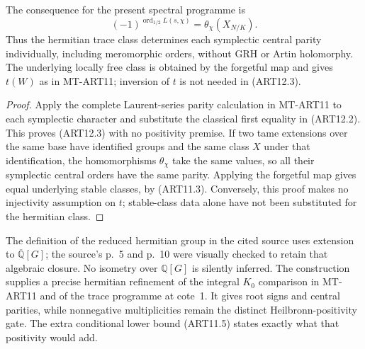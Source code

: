 The consequence for the present spectral programme is
\[
       (-1)^{\operatorname{ord}_{1/2}L(s,\chi)}
                         =\theta_\chi(X_{N/K}).           \tag{ART12.3}
\]
Thus the hermitian trace class determines each
symplectic central parity individually, including
meromorphic orders, without GRH or Artin holomorphy.
The underlying locally free class is obtained by the
forgetful map and gives $t(W)$ as in MT-ART11; inversion
of $t$ is not needed in (ART12.3).

\begin{proof}
Apply the complete Laurent-series parity calculation
in MT-ART11 to each symplectic character and substitute
the classical first equality in (ART12.2). This proves
(ART12.3) with no positivity premise. If two tame
extensions over the same base have identified groups
and the same class $X$ under that identification, the
homomorphisms $\theta_\chi$ take the same values, so
all their symplectic central orders have the same
parity. Applying the forgetful map gives equal
underlying stable classes, by (ART11.3). Conversely,
this proof makes no injectivity assumption on $t$;
stable-class data alone have not been substituted
for the hermitian class.
\end{proof}

The definition of the reduced hermitian group in
the cited source uses extension to
$\overline{\mathbb Q}[G]$; the source's p.~5 and p.~10
were visually checked to retain that algebraic closure.
No isometry over $\mathbb Q[G]$ is silently inferred.
The construction supplies a precise hermitian refinement
of the integral $K_0$ comparison in MT-ART11 and of
the trace programme at cote~1. It gives root signs
and central parities, while nonnegative multiplicities
remain the distinct Heilbronn-positivity gate. The
extra conditional lower bound (ART11.5) states exactly
what that positivity would add.

